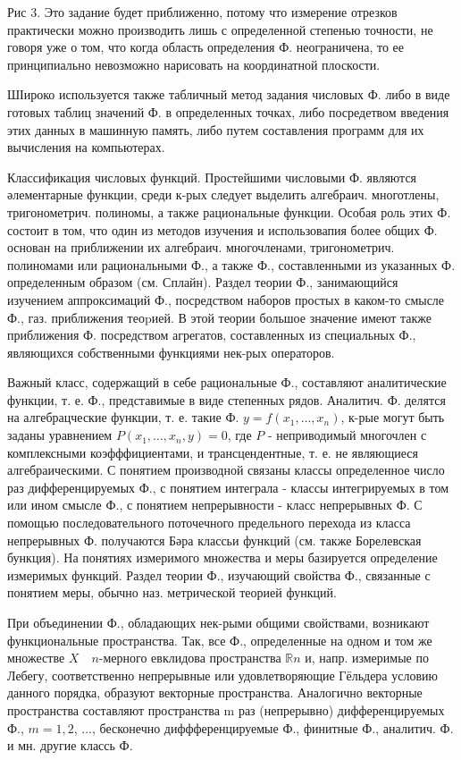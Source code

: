 \documentclass[10pt]{article}
\begin{document}
Рис 3. Это задание будет приближенно, потому что измерение отрезков практически можно производить лишь с определенной степенью точности, не говоря уже о том, что когда область определения Ф. неограничена, то ее принципиально невозможно нарисовать на координатной плоскости.



ШІироко используется также табличный метод задания числовых Ф. либо в виде готовых таблиц значений Ф. в определенных точках, либо посредетвом введения этих данных в машинную память, либо путем составления программ для их вычисления на компьютерах.



Классификация числовых функций. Простейшими числовыми Ф. являются әлементарные функции, среди к-рых следует выделить алгебраич. многотлены, тригонометрич. полиномы, а также рациональные функции. Особая роль этих Ф. состоит в том, что один из методов изучения и использовапия более общих Ф. основан на приближении их алгебраич. многочленами, тригонометрич. полиномами или рациональными Ф., а также Ф., составленными из указанных Ф. определенным образом (см. Сплайн). Раздел теории Ф., занимающийся изучением аппроксимаций Ф., посредством наборов простых в каком-то смысле Ф., газ. приближения теоpией. В этой теории большое значение имеют также приближения Ф. посредством агрегатов, составленных из специальных Ф., являющихся собственными функциями нек-рых операторов.



Важный класс, содержащий в себе рациональные Ф., составляют аналитические функции, т. е. Ф., представимые в виде степенных рядов. Аналитич. Ф. делятся на алгебрацческие функции, т. е. такие Ф. $y=f\left(x_{1}, \ldots, x_{n}\right)$, к-рые могут быть заданы уравнением $P\left(x_{1}, \ldots, x_{n}, y\right)=0$, где $P$ - неприводимый многочлен с комплексными коэфффициентами, и трансцендентные, т. е. не являющиеся алгебраическими. С понятием производной связаны классы определенное число раз дифференцируемых Ф., с понятием интеграла - классы интегрируемых в том или ином смысле Ф., с понятием непрерывности - класс непрерывных Ф. С помощью последовательного поточечного предельного перехода из класса непрерывных Ф. получаются Бәра классьи функций (см. также Борелевская бункция). На понятиях измеримого множества и меры базируется определение измеримых функций. Раздел теории Ф., изучающий свойства Ф., связанные с понятием меры, обычно наз. метрической теорией функций.



При объединении Ф., обладающих нек-рыми общими свойствами, возникают функциональные пространства. Так, все Ф., определенные на одном и том же множестве $X \quad n$-мерного евклидова пространства $\mathbb{R} n$ и, напр. измеримые по Лебегу, соответственно непрерывные или удовлетворяющие Гёльдера условию данного порядка, образуют векторные пространства. Аналогично векторные пространства составляют пространства $\mathrm{m}$ раз (непрерывно) дифференцируемых Ф., $m=1,2$, ..., бесконечно диффференцируемые Ф., финитные Ф., аналитич. Ф. и мн. другие классь $Ф$.
\end{document}
